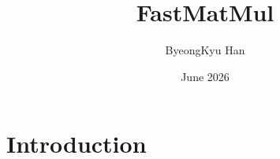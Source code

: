 \documentclass{article}
\title{FastMatMul}
\author{ByeongKyu Han}
\date{June 2026}
\begin{document}
\maketitle

\section{Introduction}
\end{document}
